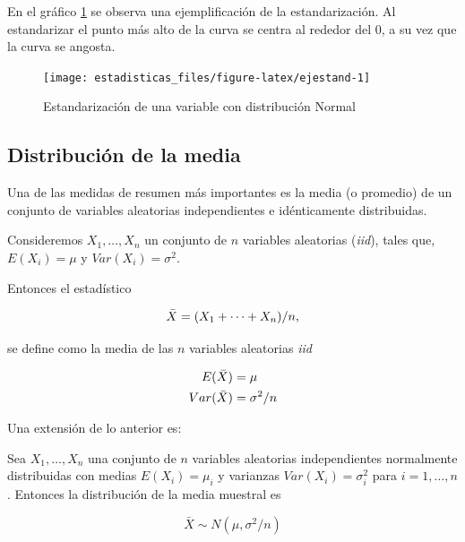 \documentclass[
  11pt,
]{book}
\theoremstyle{definition}
\theoremstyle{definition}
\theoremstyle{definition}
\theoremstyle{definition}
\theoremstyle{remark}
\begin{document}
En el gráfico \ref{fig:ejestand} se observa una ejemplificación de la estandarización. Al estandarizar el punto más alto de la curva se centra al rededor del 0, a su vez que la curva se angosta.

\begin{figure}

{\centering \texttt{[image: estadisticas\_files/figure-latex/ejestand-1]} 

}

\caption{Estandarización de una variable con distribución Normal}\label{fig:ejestand}
\end{figure}

\subsection{Distribución de la media}\label{distribuciuxf3n-de-la-media}

Una de las medidas de resumen más importantes es la media (o promedio) de un conjunto de variables aleatorias independientes e idénticamente distribuidas.

Consideremos \(X_1, \ldots , X_n\) un conjunto de \(n\) variables aleatorias (\emph{iid}), tales que, \(E(X_i) = \mu\) y \(Var(X_i) = \sigma^2\).

Entonces el estadístico

\begin{equation}
\notag
\bar{X} = (X_1 + \cdots + X_n)/n,
\end{equation}

se define como la media de las \(n\) variables aleatorias \emph{iid}

\begin{equation}
\notag
\begin{split}
E(\bar{X}) &= \mu\\
Var(\bar{X}) &= \sigma^2/n
\end{split}
\end{equation}

Una extensión de lo anterior es:

Sea \(X_1, \ldots , X_n\) una conjunto de \(n\) variables aleatorias independientes normalmente distribuidas con medias \(E(X_i) = \mu_i\) y varianzas \(Var(X_i) = \sigma_i^2\) para \(i=1,\ldots,n\). Entonces la distribución de la media muestral es

\begin{equation}
\bar{X}\sim N(\mu,\sigma^2/n)
\label{eq:distMedia}
\end{equation}
\end{document}
